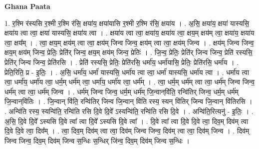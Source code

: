 \documentclass[17pt]{extarticle}
\begin{document}
\textbf{Ghana Paata } \newline

1. र॒श्मि र॑स्यसि र॒श्मी र॒श्मि र॑सि॒ क्षया॑य॒ क्षया॑यासि र॒श्मी र॒श्मि र॑सि॒ क्षया॑य । . अ॒सि॒ क्षया॑य॒ क्षया॑ यास्यसि॒ क्षया॑य त्वा त्वा॒ क्षया॑ यास्यसि॒ क्षया॑य त्वा । . क्षया॑य त्वा त्वा॒ क्षया॑य॒ क्षया॑य त्वा॒ क्षय॒म् क्षय॑म् त्वा॒ क्षया॑य॒ क्षया॑य त्वा॒ क्षय᳚म् । . त्वा॒ क्षय॒म् क्षय॑म् त्वा त्वा॒ क्षय॑म् जिन्व जिन्व॒ क्षय॑म् त्वा त्वा॒ क्षय॑म् जिन्व । . क्षय॑म् जिन्व जिन्व॒ क्षय॒म् क्षय॑म् जिन्व॒ प्रेतिः॒ प्रेति॑र् जिन्व॒ क्षय॒म् क्षय॑म् जिन्व॒ प्रेतिः॑ । . जि॒न्व॒ प्रेतिः॒ प्रेति॑र् जिन्व जिन्व॒ प्रेति॑ रस्यसि॒ प्रेति॑र् जिन्व जिन्व॒ प्रेति॑रसि । . प्रेति॑ रस्यसि॒ प्रेतिः॒ प्रेति॑रसि॒ धर्मा॑य॒ धर्मा॑यासि॒ प्रेतिः॒ प्रेति॑रसि॒ धर्मा॑य । . प्रेति॒रिति॒ प्र - इ॒तिः॒ । . अ॒सि॒ धर्मा॑य॒ धर्मा॑ यास्यसि॒ धर्मा॑य त्वा त्वा॒ धर्मा॑ यास्यसि॒ धर्मा॑य त्वा । . धर्मा॑य त्वा त्वा॒ धर्मा॑य॒ धर्मा॑य त्वा॒ धर्म॒म् धर्म॑म् त्वा॒ धर्मा॑य॒ धर्मा॑य त्वा॒ धर्म᳚म् । . त्वा॒ धर्म॒म् धर्म॑म् त्वा त्वा॒ धर्म॑म् जिन्व जिन्व॒ धर्म॑म् त्वा त्वा॒ धर्म॑म् जिन्व । . धर्म॑म् जिन्व जिन्व॒ धर्म॒म् धर्म॑म् जि॒न्वान्‌वि॑ति॒ रन्वि॑तिर् जिन्व॒ धर्म॒म् धर्म॑म् जि॒न्वान्‌वि॑तिः । . जि॒न्वान्‌ वि॑ति॒ रन्वि॑तिर् जिन्व जि॒न्वान्‌ वि॑ति रस्य॒ स्यन् वि॑तिर् जिन्व जि॒न्वान् वि॑तिरसि । . अन्वि॑ति रस्य॒ स्यन्वि॑ति॒ रन्वि॑ति रसि दि॒वे दि॒वे᳚ ऽस्यन्वि॑ति॒ रन्वि॑ति रसि दि॒वे । . अन्वि॑ति॒रित्यनु॑ - इ॒तिः॒ । . अ॒सि॒ दि॒वे दि॒वे᳚ ऽस्यसि दि॒वे त्वा᳚ त्वा दि॒वे᳚ ऽस्यसि दि॒वे त्वा᳚ । . दि॒वे त्वा᳚ त्वा दि॒वे दि॒वे त्वा॒ दिव॒म् दिव॑म् त्वा दि॒वे दि॒वे त्वा॒ दिव᳚म् । . त्वा॒ दिव॒म् दिव॑म् त्वा त्वा॒ दिव॑म् जिन्व जिन्व॒ दिव॑म् त्वा त्वा॒ दिव॑म् जिन्व । . दिव॑म् जिन्व जिन्व॒ दिव॒म् दिव॑म् जिन्व स॒न्धिः स॒न्धिर् जि॑न्व॒ दिव॒म् दिव॑म् जिन्व स॒न्धिः । \newline
\end{document}
